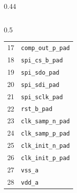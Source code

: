 \documentclass[aspectratio=169]{beamer}
\begin{document}
\begin{frame}
\begin{columns}[t]
\begin{column}{0.44\textwidth}
\begin{columns}[t,onlytextwidth]
\begin{column}{0.5\textwidth}
\begin{tabular}{r|l}
            17 & \texttt{comp\_out\_p\_pad} \\
            18 & \texttt{spi\_cs\_b\_pad} \\
            19 & \texttt{spi\_sdo\_pad} \\
            20 & \texttt{spi\_sdi\_pad} \\
            21 & \texttt{spi\_sclk\_pad} \\
            22 & \texttt{rst\_b\_pad} \\
            23 & \texttt{clk\_samp\_n\_pad} \\
            24 & \texttt{clk\_samp\_p\_pad} \\
            25 & \texttt{clk\_init\_n\_pad} \\
            26 & \texttt{clk\_init\_p\_pad} \\
            27 & \texttt{vss\_a} \\
            28 & \texttt{vdd\_a} \\
          \end{tabular}
        \end{column}
      \end{columns}
    \end{column}
  \end{columns}
\end{frame}
\end{document}
